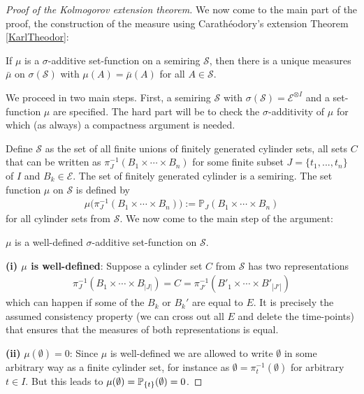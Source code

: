 \begin{proof}[Proof of the Kolmogorov extension theorem]
We now come to the main part of the proof, the construction of the measure using Carath\'eodory's extension Theorem \ref{KarlTheodor}:	
	\begin{lreminder}
	If $\mu$ is a $\sigma$-additive set-function on a semiring $\mathcal S$, then there is a unique measures $\bar \mu$ on $\sigma(\mathcal S)$ with $\mu(A)=\bar \mu(A)$ for all $A\in \mathcal S$.
	\end{lreminder}
	We proceed in two main steps. First, a semiring $\mathcal S$ with $\sigma(\mathcal S)=\mathcal E^{\otimes I}$ and a set-function $\mu$ are specified. The hard part will be to check the $\sigma$-additivity of $\mu$ for which (as always) a compactness argument is needed. \smallskip	
	
	Define $\mathcal S$ as the set of all finite unions of finitely generated cylinder sets, all sets $C$ that can be written as $\pi^{-1}_J(B_1\times \cdots \times B_n)$ for some finite subset $J=\{t_1,...,t_n\}$ of $I$ and $B_k\in \mathcal E$. The set of finitely generated cylinder is a semiring. The set function $\mu$ on $\mathcal S$ is defined by
	\begin{align}\label{eq_22}
		\mu\big(  \pi^{-1}_J(B_1\times \cdots \times B_n)  \big):=\mathbb{P}_{J}(B_1\times \cdots \times B_n)
	\end{align}
	for all cylinder sets from $\mathcal S$. We now come to the main step of the argument:
	\begin{lstep}
		$\mu$ is a well-defined $\sigma$-additive set-function on $\mathcal S$.
	\end{lstep}
	\textbf{(i) $\mu$ is well-defined}: Suppose a cylinder set $C$ from $\mathcal S$ has two representations 
	 \begin{align}\label{eq_27}
			\pi^{-1}_{J}(B_1\times \cdots \times B_{|J|})=C=\pi^{-1}_{J'}(B'_1\times \cdots \times B'_{|J'|})
	\end{align}
	which can happen if some of the $B_k$ or $B_k'$ are equal to $E$. It is precisely the assumed consistency property (we can cross out all $E$ and delete the time-points) that ensures that the measures of both representations is equal.\smallskip

	\textbf{(ii)} \textbf{$\mu(\emptyset)=0$}: Since $\mu$ is well-defined we are allowed to write $\emptyset$ in some arbitrary way as a finite cylinder set, for instance as $\emptyset = \pi^{-1}_t(\emptyset)$ for arbitrary $t\in I$. But this leads to $\mu(\emptyset)=\P_{\{t\}}(\emptyset)=0$.\smallskip


\end{proof}
